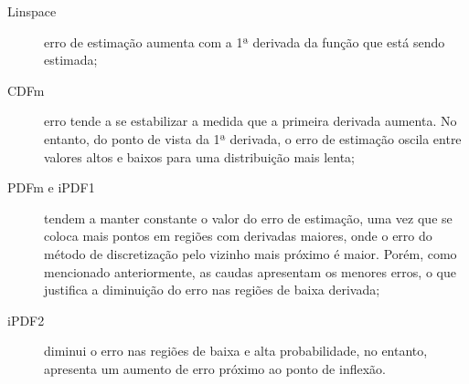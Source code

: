 \begin{description}
	\item[Linspace] erro de estimação aumenta com a 1ª derivada da função que está sendo estimada;
	\item[CDFm] erro tende a se estabilizar a medida que a primeira derivada aumenta. No entanto, do ponto de vista da 1ª derivada, o erro de estimação oscila entre valores altos e baixos para uma distribuição mais lenta;%
	\item[PDFm e iPDF1] tendem a manter constante o valor do erro de estimação, uma vez que se coloca mais pontos em regiões com derivadas maiores, onde o erro do método de discretização pelo vizinho mais próximo é maior. Porém, como mencionado anteriormente, as caudas apresentam os menores erros, o que justifica a diminuição do erro nas regiões de baixa derivada; 
	\item[iPDF2] diminui o erro nas regiões de baixa e alta probabilidade, no entanto, apresenta um aumento de erro próximo ao ponto de inflexão.
\end{description}  

